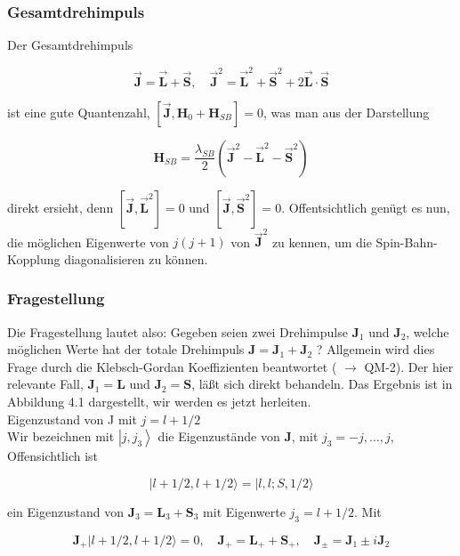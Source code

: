 \documentclass[10pt, letterpaper]{article}
\begin{document}
\subsubsection*{Gesamtdrehimpuls}
Der Gesamtdrehimpuls

$$
\overrightarrow{\mathbf{J}}=\overrightarrow{\mathbf{L}}+\overrightarrow{\mathbf{S}}, \quad \overrightarrow{\mathbf{J}}^{2}=\overrightarrow{\mathbf{L}}^{2}+\overrightarrow{\mathbf{S}}^{2}+2 \overrightarrow{\mathbf{L}} \cdot \overrightarrow{\mathbf{S}}
$$

ist eine gute Quantenzahl, $\left[\overrightarrow{\mathbf{J}}, \mathbf{H}_{0}+\mathbf{H}_{S B}\right]=0$, was man aus der Darstellung

$$
\mathbf{H}_{S B}=\frac{\lambda_{S B}}{2}\left(\overrightarrow{\mathbf{J}}^{2}-\overrightarrow{\mathbf{L}}^{2}-\overrightarrow{\mathbf{S}}^{2}\right)
$$

direkt ersieht, denn $\left[\overrightarrow{\mathbf{J}}, \overrightarrow{\mathbf{L}}^{2}\right]=0$ und $\left[\overrightarrow{\mathbf{J}}, \overrightarrow{\mathbf{S}}^{2}\right]=0$. Offentsichtlich genügt es nun, die möglichen Eigenwerte von $j(j+1)$ von $\overrightarrow{\mathbf{J}}^{2}$ zu kennen, um die Spin-Bahn-Kopplung diagonalisieren zu können.

\subsubsection*{Fragestellung}
Die Fragestellung lautet also: Gegeben seien zwei Drehimpulse $\mathbf{J}_{1}$ und $\mathbf{J}_{2}$, welche möglichen Werte hat der totale Drehimpuls $\mathbf{J}=\mathbf{J}_{1}+\mathbf{J}_{2}$ ? Allgemein wird dies Frage durch die Klebsch-Gordan Koeffizienten beantwortet ( $\rightarrow$ QM-2). Der hier relevante Fall, $\mathbf{J}_{1}=\mathbf{L}$ und $\mathbf{J}_{2}=\mathbf{S}$, läßt sich direkt behandeln. Das Ergebnis ist in Abbildung 4.1 dargestellt, wir werden es jetzt herleiten.\\
Eigenzustand von J mit $j=l+1 / 2$\\
Wir bezeichnen mit $\left|j, j_{3}\right\rangle$ die Eigenzustände von $\mathbf{J}$, mit $j_{3}=-j, \ldots, j$, Offensichtlich ist

$$
|l+1 / 2, l+1 / 2\rangle=|l, l ; S, 1 / 2\rangle
$$

ein Eigenzustand von $\mathbf{J}_{3}=\mathbf{L}_{3}+\mathbf{S}_{3}$ mit Eigenwerte $j_{3}=l+1 / 2$. Mit

$$
\mathbf{J}_{+}|l+1 / 2, l+1 / 2\rangle=0, \quad \mathbf{J}_{+}=\mathbf{L}_{+}+\mathbf{S}_{+}, \quad \mathbf{J}_{ \pm}=\mathbf{J}_{1} \pm i \mathbf{J}_{2}
$$
\end{document}
